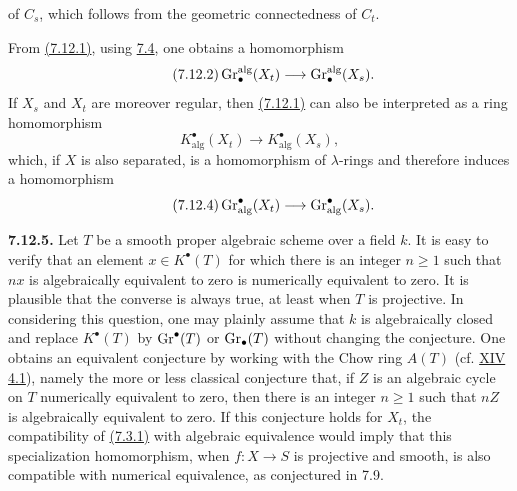 of $C_s$, which follows from the geometric connectedness of $C_t$.

From \hyperlink{sga6.e10.eq.7-12-1}{(7.12.1)}, using \hyperlink{sga6.e10.sec.7.4}{7.4}, one obtains a homomorphism
\begin{equation}\tag{7.12.2}
\operatorname{Gr}_\bullet^{\mathrm{alg}}(X_t)
\longrightarrow \operatorname{Gr}_\bullet^{\mathrm{alg}}(X_s).
\end{equation}
If $X_s$ and $X_t$ are moreover regular, then \hyperlink{sga6.e10.eq.7-12-1}{(7.12.1)} can also be
interpreted as a ring homomorphism
\begin{equation}\tag{7.12.3}
K^\bullet_{\mathrm{alg}}(X_t)
\longrightarrow K^\bullet_{\mathrm{alg}}(X_s),
\end{equation}
which, if $X$ is also separated, is a homomorphism of $\lambda$-rings and
therefore induces a homomorphism
\begin{equation}\tag{7.12.4}
\operatorname{Gr}^\bullet_{\mathrm{alg}}(X_t)
\longrightarrow \operatorname{Gr}^\bullet_{\mathrm{alg}}(X_s).
\end{equation}

\textbf{7.12.5.}
Let $T$ be a smooth proper algebraic scheme over a field $k$. It is easy to
verify that an element $x\in K^\bullet(T)$ for which there is an integer
$n\geq1$ such that $nx$ is algebraically equivalent to zero is numerically
equivalent to zero. It is plausible that the converse is always true, at
least when $T$ is projective. In considering this question, one may plainly
assume that $k$ is algebraically closed and replace $K^\bullet(T)$ by
$\operatorname{Gr}^\bullet(T)$ or $\operatorname{Gr}_\bullet(T)$ without changing the conjecture. One
obtains an equivalent conjecture by working with the Chow ring $A(T)$
(cf. \hyperlink{sga6.e14.para.4-1}{XIV 4.1}), namely the more or less classical conjecture that, if $Z$ is an
algebraic cycle on $T$ numerically equivalent to zero, then there is an
integer $n\geq1$ such that $nZ$ is algebraically equivalent to zero. If this
conjecture holds for $X_t$, the compatibility of \hyperlink{sga6.e10.eq.7-3-1}{(7.3.1)} with algebraic
equivalence would imply that this specialization homomorphism, when
$f:X\to S$ is projective and smooth, is also compatible with numerical
equivalence, as conjectured in 7.9.

